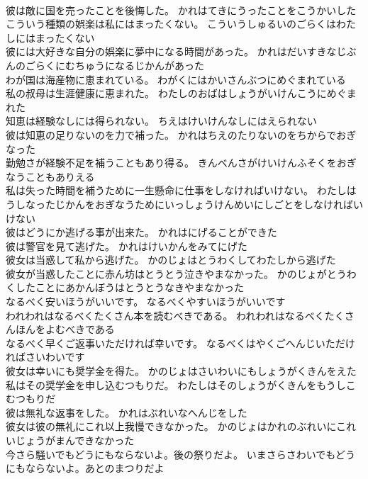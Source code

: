 \documentclass[8pt]{extreport}
\begin{document}
\begin{CJK}{UTF8}{min}
\\	彼は敵に国を売ったことを後悔した。	かれはてきにうったことをこうかいした 
\\	こういう種類の娯楽は私にはまったくない。	こういうしゅるいのごらくはわたしにはまったくない 
\\	彼には大好きな自分の娯楽に夢中になる時間があった。	かれはだいすきなじぶんのごらくにむちゅうになるじかんがあった 
\\	わが国は海産物に恵まれている。	わがくにはかいさんぶつにめぐまれている 
\\	私の叔母は生涯健康に恵まれた。	わたしのおばはしょうがいけんこうにめぐまれた 
\\	知恵は経験なしには得られない。	ちえはけいけんなしにはえられない 
\\	彼は知恵の足りないのを力で補った。	かれはちえのたりないのをちからでおぎなった 
\\	勤勉さが経験不足を補うこともあり得る。	きんべんさがけいけんふそくをおぎなうこともありえる 
\\	私は失った時間を補うために一生懸命に仕事をしなければいけない。	わたしはうしなったじかんをおぎなうためにいっしょうけんめいにしごとをしなければいけない 
\\	彼はどうにか逃げる事が出来た。	かれはにげることができた 
\\	彼は警官を見て逃げた。	かれはけいかんをみてにげた 
\\	彼女は当惑して私から逃げた。	かのじょはとうわくしてわたしから逃げた 
\\	彼女が当惑したことに赤ん坊はとうとう泣きやまなかった。	かのじょがとうわくしたことにあかんぼうはとうとうなきやまなかった 
\\	なるべく安いほうがいいです。	なるべくやすいほうがいいです 
\\	われわれはなるべくたくさん本を読むべきである。	われわれはなるべくたくさんほんをよむべきである 
\\	なるべく早くご返事いただければ幸いです。	なるべくはやくごへんじいただければさいわいです 
\\	彼女は幸いにも奨学金を得た。	かのじょはさいわいにもしょうがくきんをえた 
\\	私はその奨学金を申し込むつもりだ。	わたしはそのしょうがくきんをもうしこむつもりだ 
\\	彼は無礼な返事をした。	かれはぶれいなへんじをした 
\\	彼女は彼の無礼にこれ以上我慢できなかった。	かのじょはかれのぶれいにこれいじょうがまんできなかった 
\\	今さら騒いでもどうにもならないよ。後の祭りだよ。	いまさらさわいでもどうにもならないよ。あとのまつりだよ 

\end{CJK}
\end{document}
